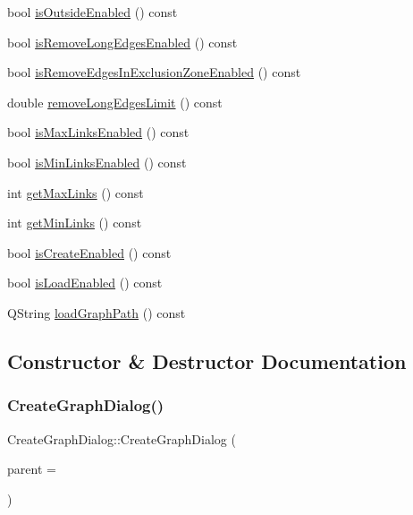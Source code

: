 \begin{DoxyCompactItemize}
\item 
bool \mbox{\hyperlink{class_create_graph_dialog_acf9b89ffbf19174f1367b72c5510b842}{is\+Outside\+Enabled}} () const
\item 
bool \mbox{\hyperlink{class_create_graph_dialog_a9db7b83e4f37f2bc277b85d12f516018}{is\+Remove\+Long\+Edges\+Enabled}} () const
\item 
bool \mbox{\hyperlink{class_create_graph_dialog_ac72e7163e517068dd80e925d233e7be8}{is\+Remove\+Edges\+In\+Exclusion\+Zone\+Enabled}} () const
\item 
double \mbox{\hyperlink{class_create_graph_dialog_a4d7cd783a4335d150ff5776782fd2444}{remove\+Long\+Edges\+Limit}} () const
\item 
bool \mbox{\hyperlink{class_create_graph_dialog_afde046356f8feccee2d005f9fe1028bc}{is\+Max\+Links\+Enabled}} () const
\item 
bool \mbox{\hyperlink{class_create_graph_dialog_a18671167300e9f475399c52ea580796b}{is\+Min\+Links\+Enabled}} () const
\item 
int \mbox{\hyperlink{class_create_graph_dialog_a5bbe3db045a2eec32abd722dbc0684fd}{get\+Max\+Links}} () const
\item 
int \mbox{\hyperlink{class_create_graph_dialog_a83fb0e283161120ef031cbb17b1caaa9}{get\+Min\+Links}} () const
\item 
bool \mbox{\hyperlink{class_create_graph_dialog_a7ab413e18a9646a3ef98f634d7ea8651}{is\+Create\+Enabled}} () const
\item 
bool \mbox{\hyperlink{class_create_graph_dialog_acd4a9edfb51bb3595dbb9a86c8233f38}{is\+Load\+Enabled}} () const
\item 
Q\+String \mbox{\hyperlink{class_create_graph_dialog_a2b55558e7da12c6566519be4c3347eea}{load\+Graph\+Path}} () const
\end{DoxyCompactItemize}


\subsection{Constructor \& Destructor Documentation}
\mbox{\label{class_create_graph_dialog_a1ca734a0c87f3878d7d27be34246e79c}} 
\subsubsection{\texorpdfstring{CreateGraphDialog()}{CreateGraphDialog()}}
{\footnotesize\ttfamily Create\+Graph\+Dialog\+::\+Create\+Graph\+Dialog (\begin{DoxyParamCaption}\item[{Q\+Widget $\ast$}]{parent = {} }\end{DoxyParamCaption})\hspace{0.3cm}{\ttfamily [explicit]}}

